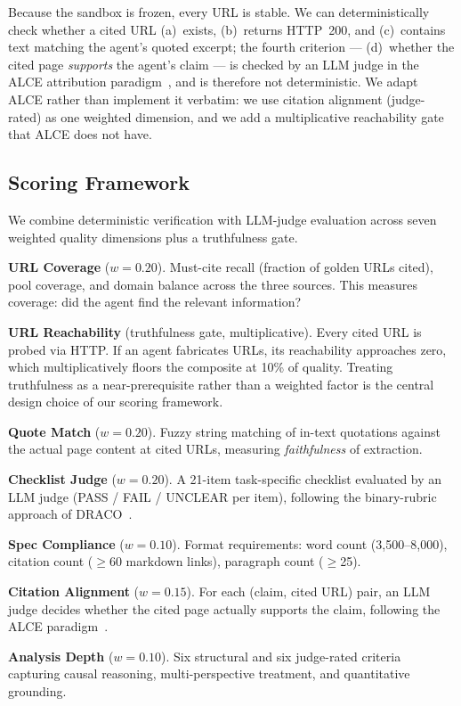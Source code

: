 \documentclass{article}
\begin{document}
Because the sandbox is frozen, every URL is stable. We can deterministically check whether a cited URL (a)~exists, (b)~returns HTTP~200, and (c)~contains text matching the agent's quoted excerpt; the fourth criterion --- (d)~whether the cited page \emph{supports} the agent's claim --- is checked by an LLM judge in the ALCE attribution paradigm~\citep{alce2023}, and is therefore not deterministic. We adapt ALCE rather than implement it verbatim: we use citation alignment (judge-rated) as one weighted dimension, and we add a multiplicative reachability gate that ALCE does not have.

\subsection{Scoring Framework}
\label{sec:scoring}

We combine deterministic verification with LLM-judge evaluation across seven weighted quality dimensions plus a truthfulness gate.

\textbf{URL Coverage} ($w{=}0.20$). Must-cite recall (fraction of golden URLs cited), pool coverage, and domain balance across the three sources. This measures coverage: did the agent find the relevant information?

\textbf{URL Reachability} (truthfulness gate, multiplicative). Every cited URL is probed via HTTP. If an agent fabricates URLs, its reachability approaches zero, which multiplicatively floors the composite at 10\% of quality. Treating truthfulness as a near-prerequisite rather than a weighted factor is the central design choice of our scoring framework.

\textbf{Quote Match} ($w{=}0.20$). Fuzzy string matching of in-text quotations against the actual page content at cited URLs, measuring \emph{faithfulness} of extraction.

\textbf{Checklist Judge} ($w{=}0.20$). A 21-item task-specific checklist evaluated by an LLM judge (PASS / FAIL / UNCLEAR per item), following the binary-rubric approach of DRACO~\citep{draco2026}.

\textbf{Spec Compliance} ($w{=}0.10$). Format requirements: word count (3{,}500--8{,}000), citation count ($\geq$60 markdown links), paragraph count ($\geq$25).

\textbf{Citation Alignment} ($w{=}0.15$). For each (claim, cited URL) pair, an LLM judge decides whether the cited page actually supports the claim, following the ALCE paradigm~\citep{alce2023}.

\textbf{Analysis Depth} ($w{=}0.10$). Six structural and six judge-rated criteria capturing causal reasoning, multi-perspective treatment, and quantitative grounding.
\end{document}
